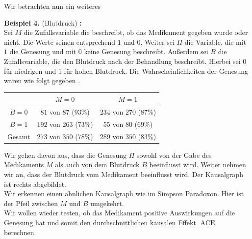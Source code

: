 \documentclass[headsepline,11pt,bibliography=leveldown]{scrbook}
\newcounter{NewZaehler}
\newcommand{\NewZahl}{\refstepcounter{NewZaehler}4.\theNewZaehler}
\newenvironment{NewBeispiel}[1]{\par\medskip\textbf{Beispiel \NewZahl} #1\textbf{:}\\}{\par\medskip}
\newcommand{\ACE}{\operatorname{ACE}}
\begin{document}
Wir betrachten nun ein weiteres
\begin{NewBeispiel}{(Blutdruck) \cite[S. 58]{Primer}}
Sei $M$ die Zufallsvariable die beschreibt, ob das Medikament gegeben wurde oder nicht. Die Werte seinen entsprechend $1$ und $0$. Weiter sei $H$ die Variable, die mit $1$ die Genesung und mit $0$ keine Genesung beschreibt. Außerdem sei $B$ die Zufallsvariable, die den Blutdruck nach der Behandlung beschreibt. Hierbei sei $0$ für niedrigen und $1$ für hohen Blutdruck. Die Wahrscheinlichkeiten der Genesung waren wie folgt gegeben \cite[S. 4]{Primer}.
\begin{center}
\begin{tabular}{| c | c | c |}
\hline
& $M = 0$ & $M = 1$\\
\hline
$B = 0$ & $81$ von $87$ ($93 \%$) & $234$ von $270$ ($87 \%$)\\
\hline
$B = 1$ & $192$ von $263$ ($73 \%$) & $55$ von $80$ ($69 \%$)\\
\hline
Gesamt & $273$ von $350$ ($78 \%$) & $289$ von $350$ ($83 \%$)\\
\hline
\end{tabular}
\end{center}
\begin{minipage}{0.5\linewidth}
Wir gehen davon aus, dass die Genesung $H$ sowohl von der Gabe des Medikaments $M$ als auch von dem Blutdruck $B$ beeinflusst wird. Weiter nehmen wir an, dass der Blutdruck vom Medikament beeinflusst wird. Der Kausalgraph ist rechts abgebildet.\\
Wir erkennen einen ähnlichen Kausalgraph wie im Simpson Paradoxon. Hier ist der Pfeil zwischen $M$ und $B$ umgekehrt.\\
Wir wollen wieder testen, ob das Medikament positive Auswirkungen auf die Genesung hat und somit den durchschnittlichen kausalen Effekt $\ACE$ berechnen.\\
\end{minipage}
\begin{minipage}{0.5\linewidth}
\begin{center}
\end{center}
\end{minipage}


\end{NewBeispiel}
\end{document}
